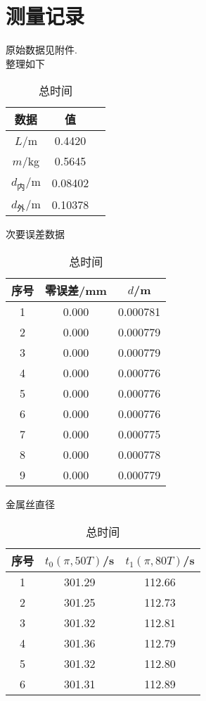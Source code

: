 \documentclass[a4paper]{article}%
\begin{document}
\section{测量记录}
原始数据见附件.\\整理如下
\begin{table}[H]
    \begin{minipage}{0.2\linewidth}
        \centering
        \begin{tabular}{ccc}
            \toprule
            数据  & 值\\
            \midrule
            $L$/m & 0.4420\\
            $m$/kg & 0.5645\\
            $d_\text{内}$/m & 0.08402\\
            $d_\text{外}$/m & 0.10378\\
            \bottomrule
        \end{tabular}
        \caption{次要误差数据}\label{1}
    \end{minipage}
    \begin{minipage}{0.4\linewidth}  
        \centering
        \begin{tabular}{ccc} 
            \toprule
            序号 &零误差/mm & $d$/m\\
            \midrule
            1&0.000&0.000781\\
            2&0.000&0.000779\\
            3&0.000&0.000779\\
            4&0.000&0.000776\\
            5&0.000&0.000776\\
            6&0.000&0.000776\\
            7&0.000&0.000775\\
            8&0.000&0.000778\\
            9&0.000&0.000779\\
            \bottomrule
        \end{tabular}
        \caption{金属丝直径}\label{2}
    \end{minipage}
    \begin{minipage}{0.3\linewidth}  
        \centering
        \begin{tabular}{ccc} 
            \toprule
            序号 &$t_0\left(\pi,50T\right)$/s & $t_1\left(\pi,80T\right)$/s\\
            \midrule
            1&301.29&112.66\\
            2&301.25&112.73\\
            3&301.32&112.81\\
            4&301.36&112.79\\
            5&301.32&112.80\\
            6&301.31&112.89\\
            \bottomrule
        \end{tabular}
        \caption{总时间}\label{3}
    \end{minipage}
\end{table}
\end{document}
